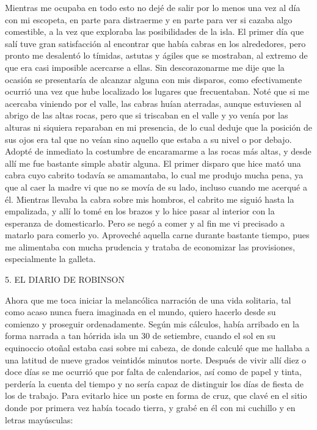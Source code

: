 \documentclass{novela}
\begin{document}
    Mientras me ocupaba en todo esto no dejé de salir por lo menos una vez al día con mi escopeta, en parte para distraerme y en parte para ver si cazaba algo comestible, a la vez que exploraba las posibilidades de la isla. El primer día que salí tuve gran satisfacción al encontrar que había cabras en los alrededores, pero pronto me desalentó lo tímidas, astutas y ágiles que se mostraban, al extremo de que era casi imposible acercarse a ellas. Sin descorazonarme me dije que la ocasión se presentaría de alcanzar alguna con mis disparos, como efectivamente ocurrió una vez que hube localizado los lugares que frecuentaban. Noté que si me acercaba viniendo por el valle, las cabras huían aterradas, aunque estuviesen al abrigo de las altas rocas, pero que si triscaban en el valle y yo venía por las alturas ni siquiera reparaban en mi presencia, de lo cual deduje que la posición de sus ojos era tal que no veían sino aquello que estaba a su nivel o por debajo. Adopté de inmediato la costumbre de encaramarme a las rocas más altas, y desde allí me fue bastante simple abatir alguna. El primer disparo que hice mató una cabra cuyo cabrito todavía se amamantaba, lo cual me produjo mucha pena, ya que al caer la madre vi que no se movía de su lado, incluso cuando me acerqué a él. Mientras llevaba la cabra sobre mis hombros, el cabrito me siguió hasta la empalizada, y allí lo tomé en los brazos y lo hice pasar al interior con la esperanza de domesticarlo. Pero se negó a comer y al fin me vi precisado a matarlo para comerlo yo. Aproveché aquella carne durante bastante tiempo, pues me alimentaba con mucha prudencia y trataba de economizar las provisiones, especialmente la galleta.





    5. EL DIARIO DE ROBINSON




    Ahora que me toca iniciar la melancólica narración de una vida solitaria, tal como acaso nunca fuera imaginada en el mundo, quiero hacerlo desde su comienzo y proseguir ordenadamente. Según mis cálculos, había arribado en la forma narrada a tan hórrida isla un 30 de setiembre, cuando el sol en su equinoccio otoñal estaba casi sobre mi cabeza, de donde calculé que me hallaba a una latitud de nueve grados veintidós minutos norte.
    Después de vivir allí diez o doce días se me ocurrió que por falta de calendarios, así como de papel y tinta, perdería la cuenta del tiempo y no sería capaz de distinguir los días de fiesta de los de trabajo. Para evitarlo hice un poste en forma de cruz, que clavé en el sitio donde por primera vez había tocado tierra, y grabé en él con mi cuchillo y en letras mayúsculas:
\end{document}
